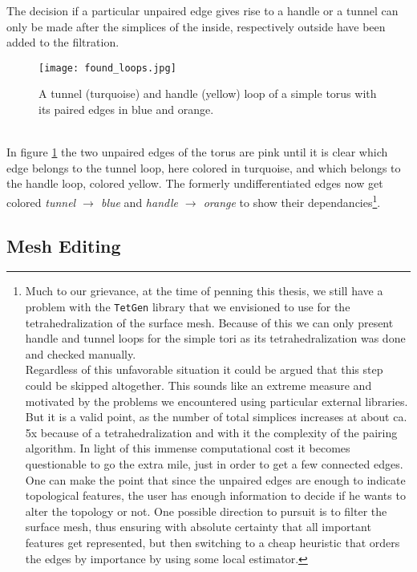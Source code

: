 The decision if a particular unpaired edge gives rise to a handle or a tunnel can only be made after the simplices of the inside, respectively outside have been added to the filtration.
\begin{figure}[ht]
\centering
\texttt{[image: found\_loops.jpg]}
\caption{A tunnel (turquoise) and handle (yellow) loop of a simple torus with its paired edges in blue and orange.}
\label{fig:found_loops}
\end{figure}\\
In figure \ref{fig:found_loops} the two unpaired edges of the torus are pink until it is clear which edge belongs to the tunnel loop, here colored in turquoise, and which belongs to the handle loop, colored yellow.
The formerly undifferentiated edges now get colored \textit{tunnel $\rightarrow$ blue} and \textit{handle $\rightarrow$ orange} to show their dependancies\footnote{ Much to our grievance, at the time of penning this thesis, we still have a problem with the \texttt{TetGen} library that we envisioned to use for the tetrahedralization of the surface mesh. Because of this we can only present handle and tunnel loops for the simple tori as its tetrahedralization was done and checked manually.\\Regardless of this unfavorable situation it could be argued that this step could be skipped altogether. This sounds like an extreme measure and motivated by the problems we encountered using particular external libraries. But it is a valid point, as the number of total simplices increases at about ca. 5x because of a tetrahedralization and with it the complexity of the pairing algorithm. In light of this immense computational cost it becomes questionable to go the extra mile, just in order to get a few connected edges. One can make the point that since the unpaired edges are enough to indicate topological features, the user has enough information to decide if he wants to alter the topology or not. One possible direction to pursuit is to filter the surface mesh, thus ensuring with absolute certainty that all important features get represented, but then switching to a cheap heuristic that orders the edges by importance by using some local estimator.}.


\subsection{Mesh Editing}
\label{topstoc22}

